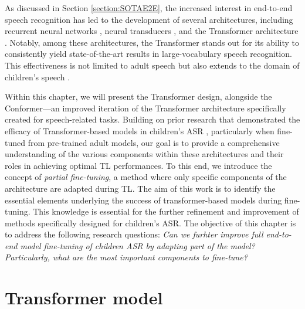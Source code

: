 As discussed in Section \ref{section:SOTAE2E}, the increased interest in end-to-end speech recognition has led to the development of several architectures, including recurrent neural networks \cite{soltau2016neural}, neural transducers \cite{battenberg2017exploring}, and the Transformer architecture \cite{vaswani2017attention}. Notably, among these architectures, the Transformer stands out for its ability to consistently yield state-of-the-art results in large-vocabulary speech recognition. This effectiveness is not limited to adult speech but also extends to the domain of children's speech \cite{gelin2021endtoend,sri_end2end}. %



Within this chapter, we will present the Transformer design, alongside the Conformer—an improved iteration of the Transformer architecture specifically created for speech-related tasks. Building on prior research that demonstrated the efficacy of Transformer-based models in children's \ac{ASR} \cite{gelin2021endtoend,sri_end2end}, particularly when fine-tuned from pre-trained adult models, our goal is to provide a comprehensive understanding of the various components within these architectures and their roles in achieving optimal \ac{TL} performances. To this end, we introduce the concept of \textit{partial fine-tuning}, a method where only specific components of the architecture are adapted during \ac{TL}. The aim of this work is to identify the essential elements underlying the success of transformer-based models during fine-tuning. This knowledge is essential for the further refinement and improvement of methods specifically designed for children's \ac{ASR}. The objective of this chapter is to address the following research questions: \textit{Can we furhter improve full end-to-end model fine-tuning of children \ac{ASR} by adapting part of the model? Particularly, what are the most important components to fine-tune?}
\section{Transformer model}
\label{sec:trans_archi}

